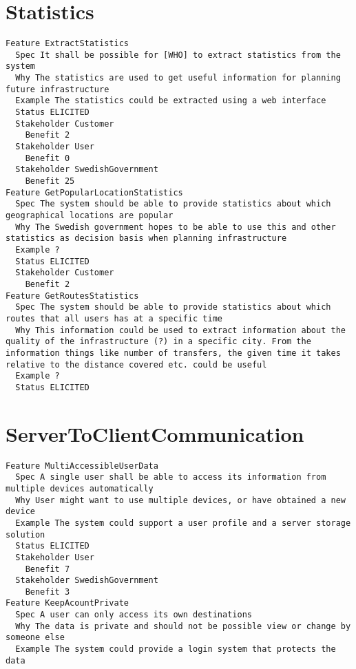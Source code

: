 \begin{lstlisting}

\end{lstlisting}


       \section{Statistics}


\begin{lstlisting}
Feature ExtractStatistics
  Spec It shall be possible for [WHO] to extract statistics from the system
  Why The statistics are used to get useful information for planning future infrastructure
  Example The statistics could be extracted using a web interface
  Status ELICITED
  Stakeholder Customer
    Benefit 2
  Stakeholder User
    Benefit 0
  Stakeholder SwedishGovernment
    Benefit 25
Feature GetPopularLocationStatistics
  Spec The system should be able to provide statistics about which geographical locations are popular
  Why The Swedish government hopes to be able to use this and other statistics as decision basis when planning infrastructure
  Example ?
  Status ELICITED
  Stakeholder Customer
    Benefit 2
Feature GetRoutesStatistics
  Spec The system should be able to provide statistics about which routes that all users has at a specific time
  Why This information could be used to extract information about the quality of the infrastructure (?) in a specific city. From the information things like number of transfers, the given time it takes relative to the distance covered etc. could be useful
  Example ?
  Status ELICITED

\end{lstlisting}
    
        
       \section{ServerToClientCommunication}


\begin{lstlisting}
Feature MultiAccessibleUserData
  Spec A single user shall be able to access its information from multiple devices automatically
  Why User might want to use multiple devices, or have obtained a new device
  Example The system could support a user profile and a server storage solution
  Status ELICITED
  Stakeholder User
    Benefit 7
  Stakeholder SwedishGovernment
    Benefit 3
Feature KeepAcountPrivate
  Spec A user can only access its own destinations
  Why The data is private and should not be possible view or change by someone else
  Example The system could provide a login system that protects the data

\end{lstlisting}
    
